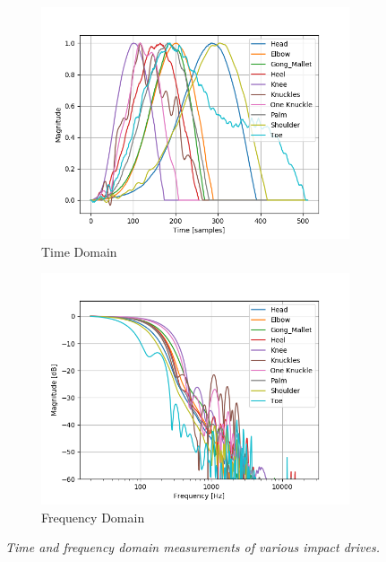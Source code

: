 \documentclass[twoside,a4paper]{article}
\begin{document}
\begin{figure}[t]
\centering
    \begin{subfigure}[b]{\columnwidth}
         \centering
         \includegraphics[width=\linewidth,trim={0 0 1cm 1cm},clip]{../Figures/Impacts_time}
         \caption{Time Domain}
    \end{subfigure}
    \begin{subfigure}[b]{\columnwidth}
         \centering
         \includegraphics[width=\linewidth,trim={0 0 1cm 1cm},clip]{../Figures/Impacts_freq}
         \caption{Frequency Domain}
    \end{subfigure}
    \caption{\it{Time and frequency domain measurements of various impact drives.}}
    \label{fig:impact}
\end{figure}
\end{document}
